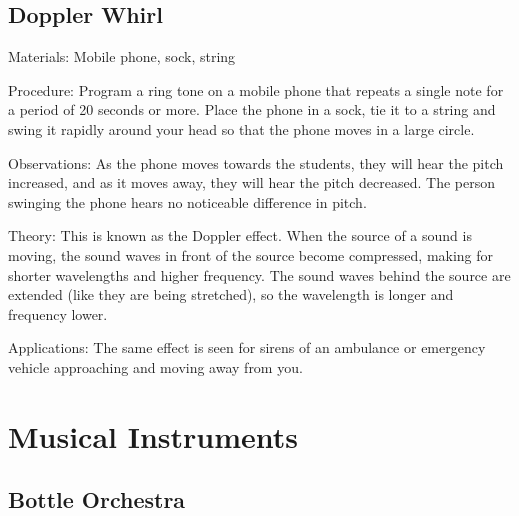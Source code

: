 \begin{multicols}{2}
\columnbreak

\subsection{Doppler Whirl}


\begin{description*}
\item[Materials:]{Mobile phone, sock, string}
\item[Procedure:]{Program a ring tone on a mobile phone that repeats a single note for a period of 20 seconds or more. Place the phone in a sock, tie it to a string and swing it rapidly around your head so that the phone moves in a large circle.}
\item[Observations:]{As the phone moves towards the students, they will hear the pitch increased, and as it moves away, they will hear the pitch decreased. The person swinging the phone hears no noticeable difference in pitch.}
\item[Theory:]{This is known as the Doppler effect. When the source of a sound is moving, the sound waves in front of the source become compressed, making for shorter wavelengths and higher frequency. The sound waves behind the source are extended (like they are being stretched), so the wavelength is longer and frequency lower.}
\item[Applications:]{The same effect is seen for sirens of an ambulance or emergency vehicle approaching and moving away from you.}
\end{description*}


\section*{Musical Instruments}


\subsection{Bottle Orchestra}


\end{multicols}
